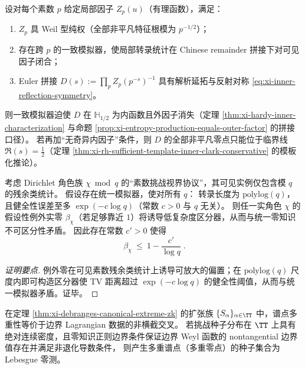 \begin{proposition}\label{prop:xi-adelic-zk-gluing-critical-line}
设对每个素数 \(p\) 给定局部因子 \(Z_p(u)\)（有理函数），满足：
\begin{enumerate}
  \item \(Z_p\) 具 Weil 型纯权（全部非平凡特征根模为 \(p^{-1/2}\)）；
  \item 存在跨 \(p\) 的一致模拟器，使局部转录统计在 Chinese remainder 拼接下对可见因子闭合；
  \item Euler 拼接
  \(
  D(s):=\prod_p Z_p(p^{-s})^{-1}
  \)
  具有解析延拓与反射对称 \eqref{eq:xi-inner-reflection-symmetry}。
\end{enumerate}
则一致模拟器迫使 \(D\) 在 \(\mathbb{H}_{1/2}\) 为内函数且外因子消失（定理 \ref{thm:xi-hardy-inner-characterization} 与命题 \ref{prop:xi-entropy-production-equals-outer-factor} 的拼接口径）。
若再加“无奇异内因子”条件，则 \(D\) 的全部非平凡零点只能位于临界线 \(\Re(s)=\tfrac12\)（定理 \ref{thm:xi-rh-sufficient-template-inner-clark-conservative} 的模板化推论）。
\end{proposition}

\begin{proposition}\label{prop:xi-dirichlet-zero-free-from-unified-zk}
考虑 Dirichlet 角色族 \(\chi\bmod q\) 的“素数挑战视界协议”，其可见实例仅包含模 \(q\) 的残余类统计。
假设存在统一模拟器，使对所有 \(q\)：
转录长度为 \(\mathrm{polylog}(q)\)，且健全性误差至多 \(\exp(-c\log q)\)（常数 \(c>0\) 与 \(q\) 无关）。
则任一实角色 \(\chi\) 的假设性例外实零 \(\beta_\chi\)（若足够靠近 \(1\)）将诱导低复杂度区分器，从而与统一零知识不可区分性矛盾。
因此存在常数 \(c'>0\) 使得
\[
\boxed{\;\beta_\chi\ \le\ 1-\frac{c'}{\log q}\; }.
\]
\end{proposition}
\begin{proof}[证明要点]
例外零在可见素数残余类统计上诱导可放大的偏置；在 \(\mathrm{polylog}(q)\) 尺度内即可构造区分器使 TV 距离超过 \(\exp(-c\log q)\) 的健全性阈值，从而与统一模拟器矛盾。证毕。
\end{proof}

\begin{corollary}\label{cor:xi-ae-simple-zeros-under-ac-seeds}
在定理 \ref{thm:xi-debranges-canonical-extreme-zk} 的扩张族 \(\{S_\alpha\}_{\alpha\in\TT}\) 中，谱点多重性等价于边界 Lagrangian 数据的非横截交叉。
若挑战种子分布在 \(\TT\) 上具有绝对连续密度，且零知识正则边界条件保证边界 Weyl 函数的 nontangential 边界值存在并满足非退化导数条件，
则产生多重谱点（多重零点）的种子集合为 Lebesgue 零测。
\end{corollary}


